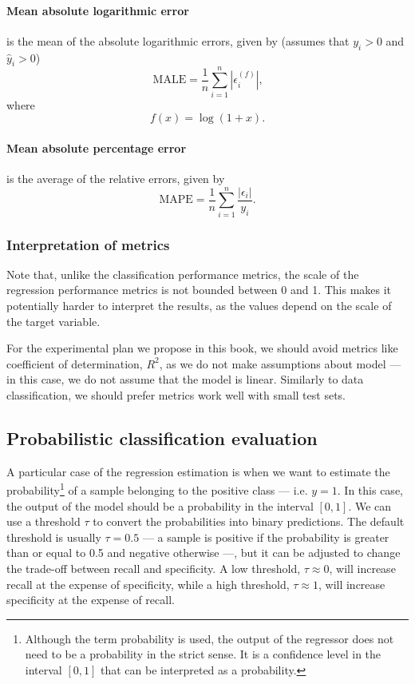 \paragraph{Mean absolute logarithmic error} is the mean of the absolute logarithmic errors,
given by (assumes that $y_i > 0$ and $\hat{y}_i > 0$)
\begin{equation*}
  \text{MALE} = \frac{1}{n} \sum_{i=1}^n | \epsilon_i^{(f)} |\text{,}
\end{equation*}
where \[
  f(x) = \log(1 + x)\text{.}
\]

\paragraph{Mean absolute percentage error} is the average of the relative errors, given by
\begin{equation*}
  \text{MAPE} = \frac{1}{n} \sum_{i=1}^n \frac{|\epsilon_i|}{y_i}\text{.}
\end{equation*}

\subsubsection{Interpretation of metrics}

Note that, unlike the classification performance metrics, the scale of the regression
performance metrics is not bounded between 0 and 1.  This makes it potentially harder to interpret
the results, as the values depend on the scale of the target variable.

For the experimental plan we propose in this book, we should avoid metrics like
coefficient of determination, $R^2$, as we do not make assumptions about model --- in this
case, we do not assume that the model is linear.  Similarly to data classification, we
should prefer metrics work well with small test sets.

\subsection{Probabilistic classification evaluation}

A particular case of the regression estimation is when we want to estimate the
probability\footnote{Although the term probability is used, the output of the regressor
does not need to be a probability in the strict sense.  It is a confidence level in the
interval $[0, 1]$ that can be interpreted as a probability.} of a sample belonging to the
positive class --- i.e. $y = 1$.  In this case, the output of the model should be a
probability in the interval $[0, 1]$.  We can use a threshold $\tau$ to convert the
probabilities into binary predictions.  The default threshold is usually $\tau = 0.5$ ---
a sample is positive if the probability is greater than or equal to 0.5 and negative
otherwise ---, but it can be adjusted to change the trade-off between recall and
specificity. A low threshold, $\tau \approx 0$, will increase recall at the expense of
specificity, while a high threshold, $\tau \approx 1$, will increase specificity at the
expense of recall.

